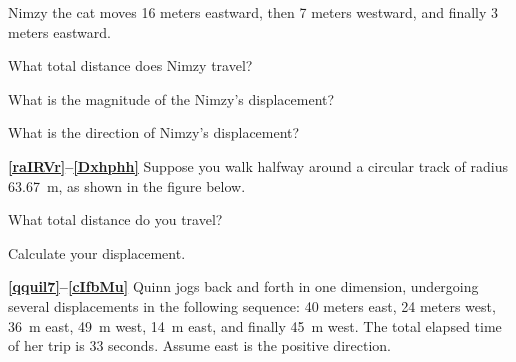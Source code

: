\documentclass[main.tex]{subfiles}
\begin{document}
\cyanhrule

\vspace{1em}

Nimzy the cat moves 16 meters eastward, then 7 meters westward, and finally 3 meters eastward.

\begin{exercise} \label{umzXid}
    What total distance does Nimzy travel?
\end{exercise}

\begin{exercise} \label{CO3yuB}
    What is the magnitude of the Nimzy's displacement?
\end{exercise}

\begin{exercise} \label{2O3f3z}
    What is the direction of Nimzy's displacement?
\end{exercise}

\cyanhrule

\vspace{1em}

\textbf{\ref{raIRVr}--\ref{Dxhphh}} Suppose you walk halfway around a circular track of radius \SI{63.67}{m}, as shown in the figure below.

\begin{center}
\end{center}

\begin{exercise} \label{raIRVr}
    What total distance do you travel?
\end{exercise}

\begin{exercise} \label{Dxhphh}
    Calculate your displacement.
\end{exercise}


\textbf{\ref{qquil7}--\ref{cIfbMu}} Quinn jogs back and forth in one dimension, undergoing several displacements in the following sequence: 40 meters east, 24 meters west, \SI{36}{m} east, \SI{49}{m} west, \SI{14}{m} east, and finally \SI{45}{m} west. The total elapsed time of her trip is 33 seconds. Assume east is the positive direction.
\end{document}
